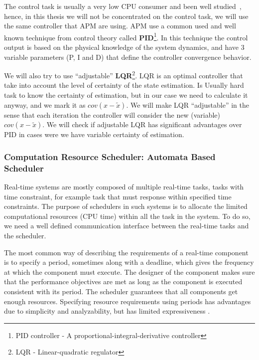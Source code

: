 \documentclass[11pt]{article}
\begin{document}
The control task is usually a very low CPU consumer and been well studied~\cite{???}, hence, in this thesis we will not be concentrated on the control task, we will use the same controller that APM are using.
APM use a common used and well known technique from control theory called {\textbf{PID}\footnote{PID controller - A proportional-integral-derivative controller}}.
In this technique the control output is based on the physical knowledge of the system dynamics, and have 3 variable parameters (P, I and D) that define the controller convergence behavior.

We will also try to use ``adjustable'' {\textbf{LQR}\footnote{LQR - Linear-quadratic regulator}}.
LQR is an optimal controller that take into account the level of certainty of the state estimation. 
Is Usually hard task to know the certainty of estimation, but in our case we need to calculate it anyway, and we mark it as $cov(x-\tilde{x})$.
We will make LQR ``adjustable'' in the sense that each iteration the controller will consider the new (variable) $cov(x-\tilde{x})$.
We will check if adjustable LQR has significant advantages over PID in cases were we have variable certainty of estimation.

\subsubsection{Computation Resource Scheduler: Automata Based Scheduler}
\label{sec:scheduler}

Real-time systems are mostly composed of multiple real-time tasks, tasks with time constraint, for example task that must response within specified time constraints.
The purpose of schedulers in such systems is to allocate the limited computational resources (CPU time) within all the task in the system. To do so, we need a well defined communication interface between the real-time tasks and the scheduler.

The most common way of describing the requirements of a real-time component is to specify a period, sometimes along with a deadline, which gives the frequency at which the component must execute. The designer of the component makes sure that the performance objectives are met as long as the component is executed consistent with its period. The scheduler guarantees that all components get enough resources.
Specifying resource requirements using periods has advantages due to simplicity and analyzability, but has limited expressiveness \cite{RTComposer}. 
\end{document}
